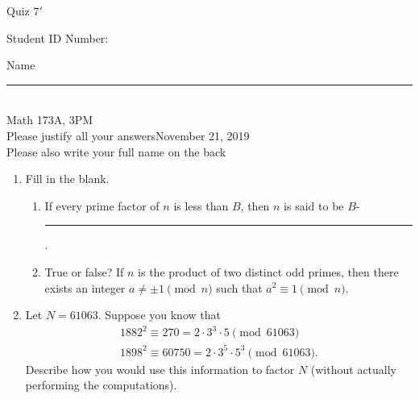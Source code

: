 \documentclass[12pt]{article}
\begin{document}
\begin{flushleft} 
\centerline{\LARGE{Quiz $7'$}} 
\vspace{5 mm}
{Student ID Number:}\hfill  
{Name \rule {2 in}{0.01in}}\\
Math 173A, 3PM
\\
{Please justify all your answers}\hfill {November 21, 2019}
\\
{Please also write your full name on the back} 

\medskip
\end{flushleft}

\begin{enumerate}
	\item Fill in the blank.
	\begin{enumerate}
		\item If every prime factor of $n$ is less than $B$, then $n$ is said to be $B$-\rule{3.5cm}{.15mm}.
		\item True or false? If $n$ is the product of two distinct odd primes, then there exists an integer $a\neq \pm 1\pmod{n}$ such that $a^2\equiv 1\pmod{n}$.
	\end{enumerate}

	\item Let $N = 61063$. Suppose you know that
	\begin{align*}
		1882^2\equiv 270 = 2\cdot 3^3\cdot 5\pmod{61063}\\
		1898^2\equiv 60750 = 2\cdot 3^5\cdot 5^3\pmod{61063}.
	\end{align*}
	Describe how you would use this information to factor $N$ (without actually performing the computations).
	\vfill
\end{enumerate}

\end{document}
